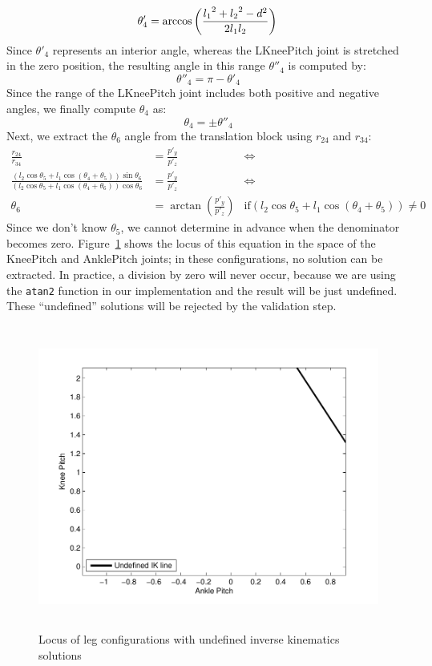 \[
\theta'_4 =\arccos\left(\frac{{l_1}^2 + {l_2}^2 - d^2}{2 l_1 l_2}\right)\\
\]
Since $\theta'_4$ represents an interior angle, whereas the LKneePitch joint is stretched in the zero position, the resulting angle in this range $\theta''_4$ is computed by:
\[
\theta''_4 = \pi - \theta'_4
\]
Since the range of the LKneePitch joint includes both positive and negative angles, we finally compute $\theta_4$ as:
\[
\theta_4 = \pm\theta''_4
\]
Next, we extract the $\theta_6$ angle from the translation block using $r_{24}$ and $r_{34}$:
\begin{align*}
\frac{r_{24}}{r_{34}} &= \frac{p'_y}{p'_z} &\Leftrightarrow \\
\frac{\left(l_2\cos\theta_5 + l_1 \cos\left(\theta_4 + \theta_5\right)\right)\sin\theta_6}{\left(l_2\cos\theta_5 + l_1 \cos\left(\theta_4 + \theta_6\right)\right) \cos\theta_6} &= \frac{p'_y}{p'_z} &\Leftrightarrow \\
\theta_6 &= \arctan\left(\frac{p'_y}{p'_z}\right)&\text{if} \left(l_2\cos\theta_5 + l_1 \cos\left(\theta_4 + \theta_5\right)\right) \neq 0
\end{align*}
Since we don't know $\theta_5$, we cannot determine in advance when the denominator becomes zero. Figure~\ref{fig:unlocus} shows the locus of this equation in the space of the KneePitch and AnklePitch joints; in these configurations, no solution can be extracted. In practice, a division by zero will never occur, because we are using the {\tt atan2} function in our implementation and the result will be just undefined. These ``undefined'' solutions will be rejected by the validation step.

\begin{figure}[!h]
	\begin{center}
		\includegraphics[height = 10cm]{Figures/locus.pdf}
 		\caption{Locus of leg configurations with undefined inverse kinematics solutions}
 		\label{fig:unlocus}
	\end{center}
\end{figure}

